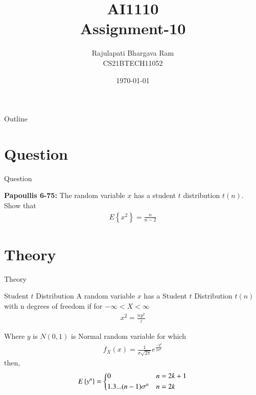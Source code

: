 \documentclass{beamer}
\title{AI1110 \\ Assignment-10}
\author{Rajulapati Bhargava Ram \\ CS21BTECH11052}
\date{\today}
\providecommand{\cbrak}[1]{\ensuremath{\left\{#1\right\}}}
\begin{document}
\begin{frame}
    \titlepage 
\end{frame}
\logo{}


\begin{frame}{Outline}
    \tableofcontents
\end{frame}



\section{Question}
\begin{frame}{Question}
    \begin{block}{\textbf{Papoullis 6-75:} } 
      The random variable $x$ has a student $t$ distribution $t(n)$. Show that 
	\begin{align}
	   E\cbrak{x^2}=\frac{n}{n-2}
	\end{align}	      
  
     \end{block}
     
\end{frame}


\section{Theory}
\begin{frame}{Theory}
   \begin{block}{Student $t$ Distribution}
      A random variable $x$ has a Student $t$ Distribution $t(n)$ with n degrees of freedom if for $-\infty<X<\infty$
     \begin{align}
       x^2 = \frac{n y^2}{z}
     \end{align}
  \end{block}   
  
  \begin{block}{}
     Where $y$ is $N(0,1)$ is Normal random variable for which  
     \begin{align}
       f_X(x) = \frac{1}{\sigma \sqrt{2 \pi}} e^{\frac{- y^2}{2 \sigma^2}}
     \end{align}
     then,
     \begin{align}
       E\cbrak{y^n} =
       \begin{dcases}
                 0 & n = 2k+1 \\
                1.3...(n-1) \sigma^n & n = 2k  \\
       \end{dcases} \label{eq4}
     \end{align}
   \end{block}	
	
\end{frame}
\end{document}
